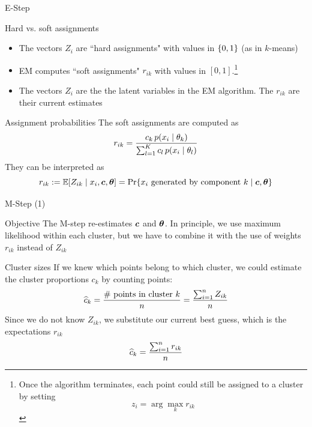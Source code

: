 \documentclass[10pt]{beamer}
\newcommand{\assign}{z} %
\newcommand{\Assign}{Z}
\newcommand{\soft}{r} %
\begin{document}
\begin{frame}{E-Step}
\footnotesize
\begin{sblock}{Hard vs. soft assignments}
\begin{itemize}
\item The vectors $\Assign_i$ are ``hard assignments" with values in $\{ {0,1} \}$ (as in $k$-means)
\item EM computes ``soft assignments" $\soft_{ik}$ with values in $[0,1]$.\footnote{\tiny Once the algorithm terminates, each point could still be assigned to a cluster by setting
\[ \assign_i = \arg\max_k \soft_{ik} \]}
\item The vectors $\Assign_i$ are the the latent variables in the EM algorithm.  The $\soft_{ik}$ are their current estimates
\end{itemize}
\end{sblock}

\begin{sblock}{Assignment probabilities}
The soft assignments are computed as
\[ \soft_{ik} = \df{c_k \, p(x_i \cond \theta_k)}{ \sum_{l=1}^K c_l  \, p(x_i \cond \theta_l)} \]
They can be interpreted as
\[  \soft_{ik} := \E [\Assign_{ik} \cond x_i, \+c, \+\theta] = \text{Pr} \set{x_i \text{ generated by component } k \cond \+c, \+\theta} \]
\end{sblock}
\end{frame}

\begin{frame}{M-Step (1)}

\begin{sblock}{Objective}
The M-step re-estimates ${\boldsymbol c}$ and ${\boldsymbol \theta}$.  In principle, we use maximum likelihood within each cluster, but we have to combine it with the use of weights $\soft_{ik}$ instead of $\Assign_{ik}$
\end{sblock}

\begin{sblock}{Cluster sizes}
If we knew which points belong to which cluster, we could estimate the cluster proportions $c_k$ by counting points:
\[ \widehat{c}_k = \df{\text{\# points in cluster } k}{n} = \df{\sum_{i=1}^n \Assign_{ik}}{n}\]
Since we do not know $\Assign_{ik}$, we substitute our current best guess, which is the expectations $\soft_{ik}$
\[ \widehat{c}_k  = \df{\sum_{i=1}^n \soft_{ik}}{n}\]
\end{sblock}
\end{frame}
\end{document}
